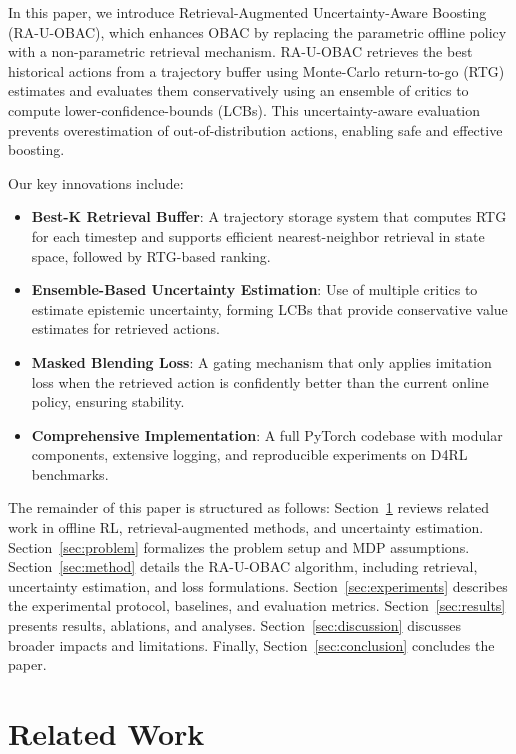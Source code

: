 \documentclass[11pt,a4paper]{article}
\begin{document}
In this paper, we introduce Retrieval-Augmented Uncertainty-Aware Boosting (RA-U-OBAC), which enhances OBAC by replacing the parametric offline policy with a non-parametric retrieval mechanism. RA-U-OBAC retrieves the best historical actions from a trajectory buffer using Monte-Carlo return-to-go (RTG) estimates and evaluates them conservatively using an ensemble of critics to compute lower-confidence-bounds (LCBs). This uncertainty-aware evaluation prevents overestimation of out-of-distribution actions, enabling safe and effective boosting.

Our key innovations include:
\begin{itemize}
  \item \textbf{Best-K Retrieval Buffer}: A trajectory storage system that computes RTG for each timestep and supports efficient nearest-neighbor retrieval in state space, followed by RTG-based ranking.
  \item \textbf{Ensemble-Based Uncertainty Estimation}: Use of multiple critics to estimate epistemic uncertainty, forming LCBs that provide conservative value estimates for retrieved actions.
  \item \textbf{Masked Blending Loss}: A gating mechanism that only applies imitation loss when the retrieved action is confidently better than the current online policy, ensuring stability.
  \item \textbf{Comprehensive Implementation}: A full PyTorch codebase with modular components, extensive logging, and reproducible experiments on D4RL benchmarks.
\end{itemize}

The remainder of this paper is structured as follows: Section~\ref{sec:related} reviews related work in offline RL, retrieval-augmented methods, and uncertainty estimation. Section~\ref{sec:problem} formalizes the problem setup and MDP assumptions. Section~\ref{sec:method} details the RA-U-OBAC algorithm, including retrieval, uncertainty estimation, and loss formulations. Section~\ref{sec:experiments} describes the experimental protocol, baselines, and evaluation metrics. Section~\ref{sec:results} presents results, ablations, and analyses. Section~\ref{sec:discussion} discusses broader impacts and limitations. Finally, Section~\ref{sec:conclusion} concludes the paper.

\section{Related Work}
\label{sec:related}
\end{document}
